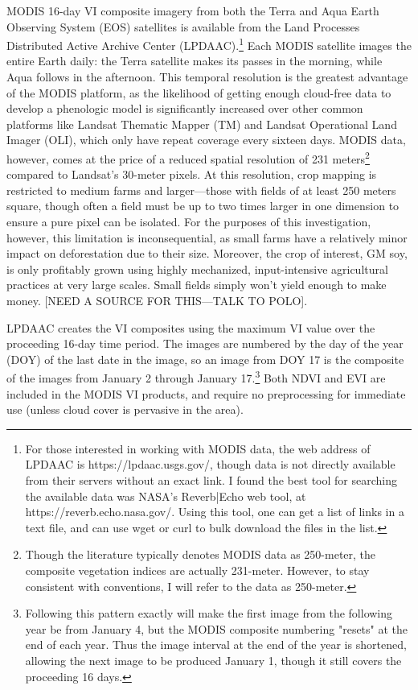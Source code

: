 MODIS 16-day VI composite imagery from both the Terra and Aqua Earth Observing System (EOS) satellites is available from the Land Processes Distributed Active Archive Center (LPDAAC).\footnote{For those interested in working with MODIS data, the web address of LPDAAC is https://lpdaac.usgs.gov/, though data is not directly available from their servers without an exact link. I found the best tool for searching the available data was NASA’s Reverb|Echo web tool, at https://reverb.echo.nasa.gov/. Using this tool, one can get a list of links in a text file, and can use wget or curl to bulk download the files in the list.} Each MODIS satellite images the entire Earth daily: the Terra satellite makes its passes in the morning, while Aqua follows in the afternoon. This temporal resolution is the greatest advantage of the MODIS platform, as the likelihood of getting enough cloud-free data to develop a phenologic model is significantly increased over other common platforms like Landsat Thematic Mapper (TM) and Landsat Operational Land Imager (OLI), which only have repeat coverage every sixteen days. MODIS data, however, comes at the price of a reduced spatial resolution of 231 meters\footnote{Though the literature typically denotes MODIS data as 250-meter, the composite vegetation indices are actually 231-meter. However, to stay consistent with conventions, I will refer to the data as 250-meter.} compared to Landsat’s 30-meter pixels. At this resolution, crop mapping is restricted to medium farms and larger---those with fields of at least 250 meters square, though often a field must be up to two times larger in one dimension to ensure a pure pixel can be isolated. For the purposes of this investigation, however, this limitation is inconsequential, as small farms have a relatively minor impact on deforestation due to their size. Moreover, the crop of interest, GM soy, is only profitably grown using highly mechanized, input-intensive agricultural practices at very large scales. Small fields simply won't yield enough to make money. [NEED A SOURCE FOR THIS---TALK TO POLO].

LPDAAC creates the VI composites using the maximum VI value over the proceeding 16-day time period. The images are numbered by the day of the year (DOY) of the last date in the image, so an image from DOY 17 is the composite of the images from January 2 through January 17.\footnote{Following this pattern exactly will make the first image from the following year be from January 4, but the MODIS composite numbering "resets" at the end of each year. Thus the image interval at the end of the year is shortened, allowing the next image to be produced January 1, though it still covers the proceeding 16 days.} Both NDVI and EVI are included in the MODIS VI products, and require no preprocessing for immediate use (unless cloud cover is pervasive in the area).

